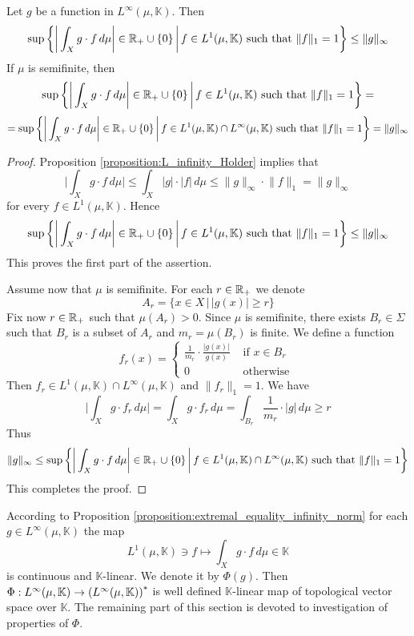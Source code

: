 \begin{proposition}\label{proposition:extremal_equality_infinity_norm}
  Let $g$ be a function in $L^{\infty}(\mu,\mathbb{K})$. Then
  $$\sup \bigg\{\bigg|\int_Xg\cdot f\,d\mu\bigg|\in {\mathbb R}_+\cup \{0\}\,\bigg|\,f \in L^1(\mu,\mathbb{K})\mbox{ such that }\lVert f\rVert_1 = 1\bigg\} \leq \lVert g \rVert_{\infty}$$
  If $\mu$ is semifinite, then
  $$\sup \bigg\{\bigg|\int_Xg\cdot f\,d\mu\bigg|\in {\mathbb R}_+\cup \{0\}\,\bigg|\,f \in L^1(\mu,\mathbb{K})\mbox{ such that }\lVert f\rVert_1 = 1\bigg\} =$$
  $$=\sup \bigg\{\bigg|\int_Xg\cdot f\,d\mu\bigg|\in {\mathbb R}_+\cup \{0\}\,\bigg|\,f \in L^1(\mu,\mathbb{K})\cap L^{\infty}(\mu,\mathbb{K})\mbox{ such that }\lVert f\rVert_1 = 1\bigg\} = \lVert g \rVert_{\infty}$$
\end{proposition}
\begin{proof}
  Proposition \ref{proposition:L_infinity_Holder} implies that
  $$\bigg|\int_X g\cdot f\,d\mu \bigg| \leq \int_X |g|\cdot |f|\,d\mu \leq \lVert g \rVert_{\infty}\cdot \lVert f \rVert_1 = \lVert g \rVert_{\infty}$$
  for every $f \in L^1(\mu,\mathbb{K})$. Hence
  $$\sup \bigg\{\bigg|\int_Xg\cdot f\,d\mu\bigg|\in {\mathbb R}_+\cup \{0\}\,\bigg|\,f \in L^1(\mu,\mathbb{K})\mbox{ such that }\lVert f\rVert_1 = 1\bigg\} \leq \lVert g\rVert_{\infty}$$
  This proves the first part of the assertion.

  Assume now that $\mu$ is semifinite. For each $r \in {\mathbb R}_+$ we denote
  $$A_r = \big\{x\in X\,\big|\,|g(x)|\geq r \big\}$$
  Fix now $r \in {\mathbb R}_+$ such that $\mu(A_r) > 0$. Since $\mu$ is semifinite, there exists $B_r \in \Sigma$ such that $B_r$ is a subset of $A_r$ and $m_r = \mu(B_r)$ is finite. We define a function
  $$f_r(x) = \begin{cases}
    \frac{1}{m_r}\cdot \frac{|g(x)|}{g(x)}&\mbox{ if }x \in B_r\\
    0&\mbox{ otherwise }
  \end{cases}$$
  Then $f_r \in L^1(\mu,\mathbb{K})\cap L^{\infty}(\mu,\mathbb{K})$ and $\lVert f_r \rVert_1 = 1$. We have
  $$\bigg|\int_Xg\cdot f_r\,d\mu\bigg| = \int_Xg\cdot f_r\,d\mu = \int_{B_r} \frac{1}{m_r}\cdot |g|\,d\mu \geq r $$
  Thus
  $$\lVert g\rVert_{\infty} \leq \sup \bigg\{\bigg|\int_Xg\cdot f\,d\mu\bigg|\in {\mathbb R}_+\cup \{0\}\,\bigg|\,f \in L^1(\mu,\mathbb{K})\cap L^{\infty}(\mu,\mathbb{K})\mbox{ such that }\lVert f\rVert_1 = 1\bigg\}$$
  This completes the proof.
\end{proof}
\noindent
According to Proposition \ref{proposition:extremal_equality_infinity_norm} for each $g \in L^{\infty}(\mu,\mathbb{K})$ the map
$$L^1(\mu,\mathbb{K}) \ni f \mapsto \int_Xg\cdot f\,d\mu \in \mathbb{K}$$
is continuous and $\mathbb{K}$-linear. We denote it by $\Phi(g)$. Then $\Phi:L^{\infty}(\mu,\mathbb{K})\rightarrow \left(L^{\infty}(\mu,\mathbb{K})\right)^*$ is well defined $\mathbb{K}$-linear map of topological vector space over $\mathbb{K}$. The remaining part of this section is devoted to investigation of properties of $\Phi$.

